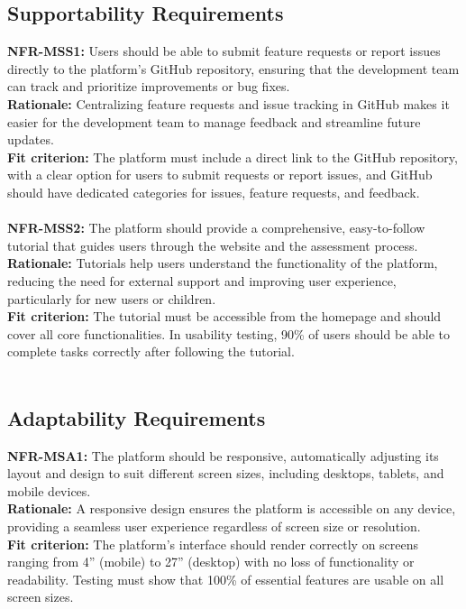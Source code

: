 \documentclass[12pt]{article}
\begin{document}
\subsection{Supportability Requirements}
\textbf{NFR-MSS1: }Users should be able to submit feature requests or report issues directly to the platform’s GitHub repository, ensuring that the development team can track and prioritize improvements or bug fixes.\\
\textbf{Rationale: }Centralizing feature requests and issue tracking in GitHub makes it easier for the development team to manage feedback and streamline future updates.\\
\textbf{Fit criterion: }The platform must include a direct link to the GitHub repository, with a clear option for users to submit requests or report issues, and GitHub should have dedicated categories for issues, 
feature requests, and feedback.\\\\
\textbf{NFR-MSS2: }The platform should provide a comprehensive, easy-to-follow tutorial that guides users through the website and the assessment process.\\
\textbf{Rationale: }Tutorials help users understand the functionality of the platform, reducing the need for external support and improving user experience, particularly for new users or children.\\
\textbf{Fit criterion: }The tutorial must be accessible from the homepage and should cover all core functionalities. In usability testing, 90\% of users should be able to complete tasks correctly after following the
 tutorial.\\\\
\subsection{Adaptability Requirements}
\textbf{NFR-MSA1: }The platform should be responsive, automatically adjusting its layout and design to suit different screen sizes, including desktops, tablets, and mobile devices.\\
\textbf{Rationale: }A responsive design ensures the platform is accessible on any device, providing a seamless user experience regardless of screen size or resolution.\\
\textbf{Fit criterion: }The platform’s interface should render correctly on screens ranging from 4” (mobile) to 27” (desktop) with no loss of functionality or readability. Testing must show that 100\% of essential 
features are usable on all screen sizes.\\\\
\end{document}

